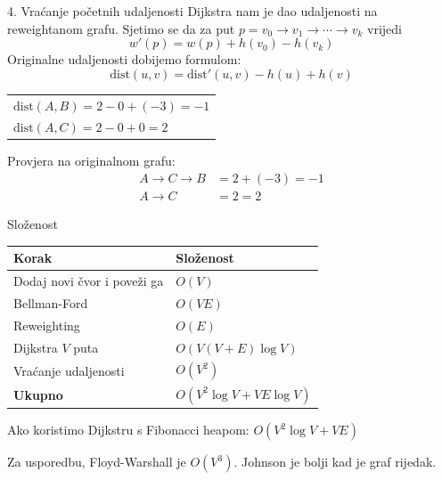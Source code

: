 \documentclass{beamer}
\begin{document}
\begin{frame}{4. Vraćanje početnih udaljenosti}
  Dijkstra nam je dao udaljenosti na reweightanom grafu.
  Sjetimo se da za put $p = v_0 \to v_1 \to \cdots \to v_k$ vrijedi
  \[ w'(p) = w(p) + h(v_0) - h(v_k) \]
  Originalne udaljenosti dobijemo formulom:
  \[ \text{dist}(u, v) = \text{dist}'(u, v) - h(u) + h(v) \]

  \vspace{0.3em}
  \centering
  \hspace{0.5em}%

  \vspace{0.5em}
  {\scriptsize
  \begin{tabular}{l}
    $\text{dist}(A,B) = 2 - 0 + (-3) = -1$ \\
    $\text{dist}(A,C) = 2 - 0 + 0 = 2$
  \end{tabular}
  }

  \vspace{0.5em}
  \raggedright
  Provjera na originalnom grafu:
  \begin{align}
    A \to C \to B &= 2 + (-3) = -1 \\
    A \to C &= 2 = 2
  \end{align}
\end{frame}



\begin{frame}{Složenost}
  \begin{tabular}{l|l}
    \textbf{Korak} & \textbf{Složenost} \\ \hline
    Dodaj novi čvor i poveži ga & $O(V)$ \\
    Bellman-Ford & $O(VE)$ \\
    Reweighting & $O(E)$ \\
    Dijkstra $V$ puta & $O(V(V + E)\log V)$ \\
    Vraćanje udaljenosti & $O(V^2)$ \\ \hline
    \textbf{Ukupno} & $O(V^2 \log V + VE\log V)$
  \end{tabular}

  \vspace{1em}
  Ako koristimo Dijkstru s Fibonacci heapom: $O(V^2 \log V + VE)$

  \vspace{0.5em}
  Za usporedbu, Floyd-Warshall je $O(V^3)$.
  Johnson je bolji kad je graf rijedak.
\end{frame}
\end{document}
